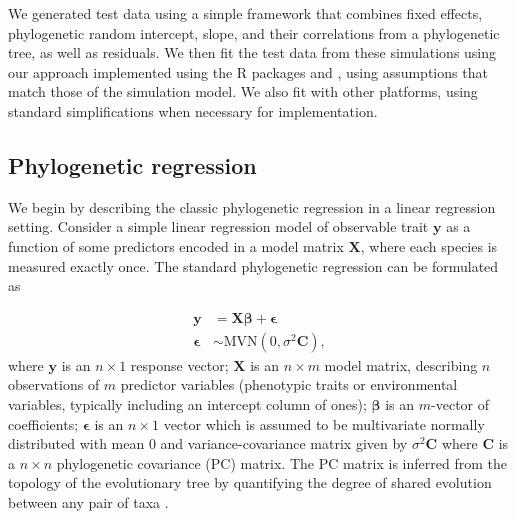 \documentclass[12pt]{article}
\begin{document}
\newcommand{\bX}{{\mathbf X}}
\newcommand{\bbeta}{{\boldsymbol \beta}}
\newcommand{\bmu}{{\boldsymbol \mu}}
\newcommand{\bY}{{\mathbf y}}  %
\newcommand{\bC}{{\mathbf C}}
\newcommand{\bZ}{{\mathbf Z}}
\newcommand{\bb}{{\mathbf b}}
\newcommand{\besp}{{\boldsymbol \epsilon}}
\newcommand{\bSigma}{{\boldsymbol \Sigma}}

We generated test data using a simple framework that combines fixed effects, phylogenetic random intercept, slope, and their correlations from a phylogenetic tree, as well as residuals. 
We then fit the test data from these simulations using our approach implemented using the R packages  \citep{bates2015fitting} and  \citep{brooks2017glmmTMB}, using assumptions that match those of the simulation model. We also fit with other platforms, using standard simplifications when necessary for implementation.

\subsection*{Phylogenetic regression}

We begin by describing the classic phylogenetic regression in a linear regression setting.
Consider a simple linear regression model of observable trait $\bY$ as a function of some predictors encoded in a model matrix $\bX$, where each species is measured exactly once. 
The standard phylogenetic regression can be formulated as


\begin{equation}
\begin{aligned}
\bY & = \bX \bbeta + \besp  \\
\besp & \sim \textrm{MVN}(0,\sigma^{2} \bC), 
\label{eq:gls}
\end{aligned}
\end{equation}
where $\bY$ is an $n \times 1$ response vector; $\bX$ is an $n \times m$ model matrix, describing $n$ observations of $m$ predictor variables (phenotypic traits or environmental variables, typically including an intercept column of ones); $\bbeta$ is an $m$-vector of coefficients; $\besp$ is an $n \times 1$ vector which is assumed to be multivariate normally distributed with mean $0$ and variance-covariance matrix given by $\sigma^{2} \bC$ where $\bC$ is a $n \times n$ phylogenetic covariance (PC) matrix.
The PC matrix is inferred from the topology of the evolutionary tree by quantifying the degree of shared evolution between any pair of taxa \citep{garamszegi2014modern}.
\end{document}
